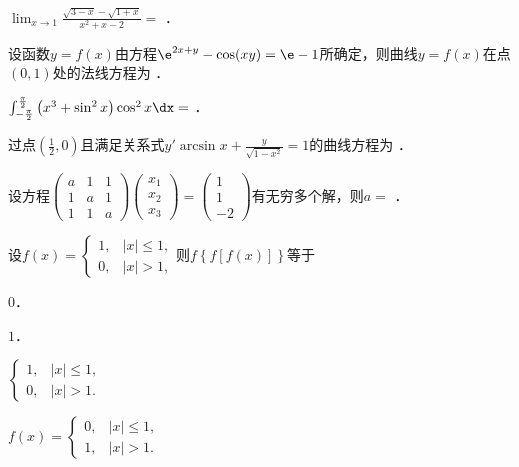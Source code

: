 \documentclass[plain,noanswer,medmath]{../../template/jnuexam}
\begin{document}






\begin{problem}
$\lim_{x \to 1} \frac{\sqrt{3 - x} - \sqrt{1 + x}}{x^2 + x - 2} =$ \fillin{}．
\end{problem}


\begin{problem}
设函数$y = f(x)$由方程$\e^{2x + y} - \cos(xy) = \e - 1$所确定，则曲线$y = f(x)$在点$(0,1)$处的法线方程为 \fillin{}．
\end{problem}


\begin{problem}
$\int_{- \frac{\pi}{2}}^{\frac{\pi}{2}} \left(x^3 + \sin^2 x \right) \cos^2 x\dx =$ \fillin{}．
\end{problem}


\begin{problem}
过点$\left(\frac{1}{2},0 \right)$且满足关系式$y'\arcsin x + \frac{y}{\sqrt{1 - x^2}} = 1$的曲线方程为 \fillin{}．
\end{problem}


\begin{problem}
设方程$\begin{pmatrix}
  a & 1 & 1 \\
  1 & a & 1 \\
  1 & 1 & a
\end{pmatrix}\begin{pmatrix}
  x_1 \\
  x_2 \\
  x_3
\end{pmatrix} = \begin{pmatrix}
  1 \\
  1 \\
  -2
\end{pmatrix}$有无穷多个解，则$a =$ \fillin{}．
\end{problem}




\begin{problem}
设$f(x) = \begin{cases}
  1, & |x| \le 1, \\
  0, & |x| > 1,
\end{cases}$则$f\left\{f\left[f(x) \right] \right\}$等于\pickout{}
\begin{abcd}
\item $0$．
\item $1$．
\item $\begin{cases}
  1, & |x| \le 1, \\
  0, & |x| > 1.
\end{cases}$
\item $f(x) = \begin{cases}
  0, & |x| \le 1, \\
  1, & |x| > 1.
\end{cases}$
\end{abcd}
\end{problem}
\end{document}
